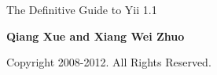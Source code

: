 
\thispagestyle{empty}
\begin{center}
    \bfseries \rule{0cm}{1.5cm} \Huge
    The Definitive Guide to Yii 1.1
     \vspace{1.5cm}
\end{center}

\begin{center}
    \bfseries \Large Qiang Xue and Xiang Wei Zhuo
\end{center}


\begin{center}
   Copyright 2008-2012. All Rights Reserved.
\end{center}

\vfill

\pagebreak \thispagestyle{empty} \cleardoublepage
